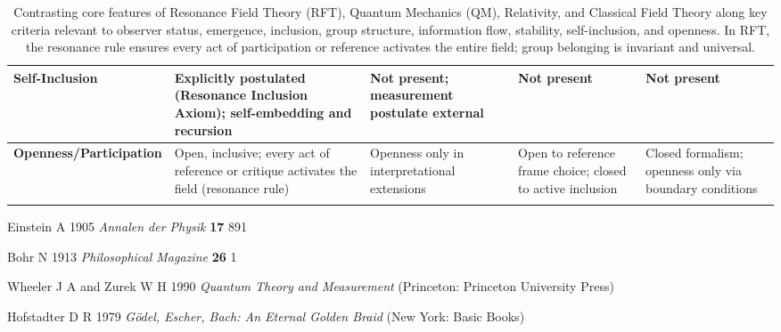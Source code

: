\documentclass[12pt]{article}
\begin{document}
\begin{center}
\begin{longtable}{|p{4cm}|p{3cm}|p{3cm}|p{3cm}|p{3cm}|}
		\hline
		\textbf{Self-Inclusion} & Explicitly postulated (Resonance Inclusion Axiom); self-embedding and recursion & Not present; measurement postulate external & Not present & Not present \\
		\hline
		\textbf{Openness/Participation} & Open, inclusive; every act of reference or critique activates the field (resonance rule) & Openness only in interpretational extensions & Open to reference frame choice; closed to active inclusion & Closed formalism; openness only via boundary conditions \\
		\hline
		
		\caption{Contrasting core features of Resonance Field Theory (RFT), Quantum Mechanics (QM), Relativity, and Classical Field Theory along key criteria relevant to observer status, emergence, inclusion, group structure, information flow, stability, self-inclusion, and openness. In RFT, the resonance rule ensures every act of participation or reference activates the entire field; group belonging is invariant and universal.}
		\label{tab:rft_comparison}
	\end{longtable}
\end{center}
\begin{thebibliography}{99}
	
	Einstein A 1905 \textit{Annalen der Physik} \textbf{17} 891
	
	Bohr N 1913 \textit{Philosophical Magazine} \textbf{26} 1
	
	Wheeler J A and Zurek W H 1990 \textit{Quantum Theory and Measurement} (Princeton: Princeton University Press)
	
	Hofstadter D R 1979 \textit{G\"odel, Escher, Bach: An Eternal Golden Braid} (New York: Basic Books)
	
\end{thebibliography}
\end{document}
